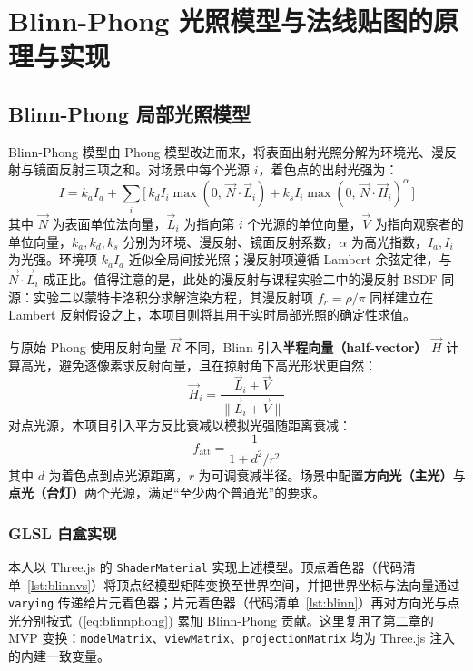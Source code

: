 \documentclass[11pt, a4paper, oneside]{report}
\newcommand{\keyword}[1]{\textbf{#1}}
\newcommand{\code}[1]{\texttt{#1}}
\begin{document}
\chapter{Blinn-Phong 光照模型与法线贴图的原理与实现}

\section{Blinn-Phong 局部光照模型}
Blinn-Phong 模型由 Phong 模型改进而来，将表面出射光照分解为环境光、漫反射与镜面反射三项之和。对场景中每个光源 $i$，着色点的出射光强为：
\begin{equation}
\label{eq:blinnphong}
I = k_a I_a + \sum_{i} \Big[\, k_d I_i \max(0,\, \vec{N}\cdot\vec{L}_i) + k_s I_i \max(0,\, \vec{N}\cdot\vec{H}_i)^{\alpha} \,\Big]
\end{equation}
其中 $\vec{N}$ 为表面单位法向量，$\vec{L}_i$ 为指向第 $i$ 个光源的单位向量，$\vec{V}$ 为指向观察者的单位向量，$k_a, k_d, k_s$ 分别为环境、漫反射、镜面反射系数，$\alpha$ 为高光指数，$I_a, I_i$ 为光强。环境项 $k_a I_a$ 近似全局间接光照；漫反射项遵循 Lambert 余弦定律，与 $\vec{N}\cdot\vec{L}_i$ 成正比。值得注意的是，此处的漫反射与课程实验二中的漫反射 BSDF 同源：实验二以蒙特卡洛积分求解渲染方程，其漫反射项 $f_r=\rho/\pi$ 同样建立在 Lambert 反射假设之上，本项目则将其用于实时局部光照的确定性求值。

与原始 Phong 使用反射向量 $\vec{R}$ 不同，Blinn 引入\keyword{半程向量（half-vector）} $\vec{H}$ 计算高光，避免逐像素求反射向量，且在掠射角下高光形状更自然：
\begin{equation}
\vec{H}_i = \frac{\vec{L}_i + \vec{V}}{\lVert \vec{L}_i + \vec{V} \rVert}
\end{equation}
对点光源，本项目引入平方反比衰减以模拟光强随距离衰减：
\begin{equation}
f_{\text{att}} = \frac{1}{1 + d^2 / r^2}
\end{equation}
其中 $d$ 为着色点到点光源距离，$r$ 为可调衰减半径。场景中配置\keyword{方向光（主光）}与\keyword{点光（台灯）}两个光源，满足“至少两个普通光”的要求。

\subsection{GLSL 白盒实现}
本人以 Three.js 的 \code{ShaderMaterial} 实现上述模型。顶点着色器（代码清单~\ref{lst:blinnvs}）将顶点经模型矩阵变换至世界空间，并把世界坐标与法向量通过 \code{varying} 传递给片元着色器；片元着色器（代码清单~\ref{lst:blinn}）再对方向光与点光分别按式~(\ref{eq:blinnphong}) 累加 Blinn-Phong 贡献。这里复用了第二章的 MVP 变换：\code{modelMatrix}、\code{viewMatrix}、\code{projectionMatrix} 均为 Three.js 注入的内建一致变量。
\end{document}
